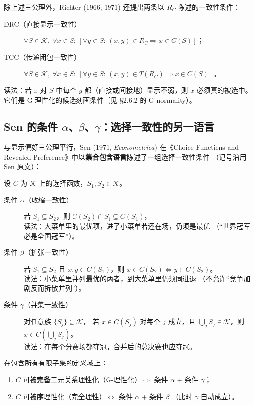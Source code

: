 除上述三公理外，Richter (1966; 1971) 还提出两条以 $R_C$ 陈述的一致性条件：
\begin{description}
  \item[DRC（直接显示一致性）] $\forall S\in\mathcal{K},\ \forall x\in S:\
  [\forall y\in S:\ (x,y)\in R_C \Rightarrow x\in C(S)]$；
  \item[TCC（传递闭包一致性）] $\forall S\in\mathcal{K},\ \forall x\in S:\
  [\forall y\in S:\ (x,y)\in T(R_C) \Rightarrow x\in C(S)]$。
\end{description}
读法：若 $x$ 对 $S$ 中每个 $y$ 都（直接或间接地）显示不弱，则 $x$ 必须真的被选中。
它们是 G-理性化的候选刻画条件（见 §2.6.2 的 G-normality）。

\subsection{Sen 的条件 \texorpdfstring{$\alpha$、$\beta$、$\gamma$}{α、β、γ}：选择一致性的另一语言}

与显示偏好三公理平行，Sen (1971, \emph{Econometrica}) 在《Choice Functions and
Revealed Preference》中以\textbf{集合包含语言}陈述了一组选择一致性条件
（记号沿用 Sen 原文）：

\begin{definition}\label{def:senabc}
设 $C$ 为 $\mathcal{K}$ 上的选择函数，$S_1,S_2\in\mathcal{K}$。
\begin{description}
  \item[条件 $\alpha$（收缩一致性）] 若 $S_1\subseteq S_2$，则
  $C(S_2)\cap S_1\subseteq C(S_1)$。\\
  读法：大菜单里的最优项，进了小菜单若还在场，仍须是最优
  （“世界冠军必是全国冠军”）。
  \item[条件 $\beta$（扩张一致性）] 若 $S_1\subseteq S_2$ 且
  $x,y\in C(S_1)$，则 $x\in C(S_2)\iff y\in C(S_2)$。\\
  读法：小菜单里并列最优的两者，到大菜单里仍须同进退
  （不允许“竞争加剧反而拆散并列”）。
  \item[条件 $\gamma$（并集一致性）] 对任意族 $\{S_j\}\subseteq\mathcal{K}$，
  若 $x\in C(S_j)$ 对每个 $j$ 成立，且 $\bigcup_j S_j\in\mathcal{K}$，则
  $x\in C(\bigcup_j S_j)$。\\
  读法：在每个分赛场都夺冠，合并后的总决赛也应夺冠。
\end{description}
\end{definition}

\begin{theorem}
在包含所有有限子集的定义域上：
\begin{enumerate}
  \item $C$ 可被\textbf{完备}二元关系理性化（G-理性化）$\iff$ 条件 $\alpha$ + 条件 $\gamma$；
  \item $C$ 可被\textbf{序}理性化（完全理性）$\iff$ 条件 $\alpha$ + 条件 $\beta$
  （此时 $\gamma$ 自动成立）。
\end{enumerate}
\end{theorem}

